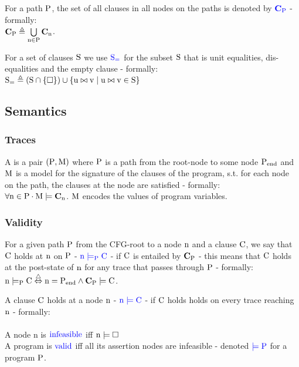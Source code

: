 \noindent
For a path $\mathrm{P}$, the set of all clauses in all nodes on the paths is denoted by $\textcolor{blue}{\mathbf{C}_{\mathrm{P}}}$ - formally:\\
$\mathrm{ \mathbf{C}_{\mathrm{P}} \triangleq \bigcup\limits_{n \in P} \mathbf{C}_{\mathrm{n}}}$.

\noindent
For a set of clauses $\mathrm{S}$ we use $\textcolor{blue}{\mathrm{{S}_{=}}}$ for the subset $\mathrm{S}$ that is unit equalities, dis-equalities and the empty clause - formally:\\
$\mathrm{\mathrm{{S}_{=}} \triangleq (S \cap \left\{\mathrm{\square}\right\}) \cup \left\{\mathrm{u \bowtie v \mid u \bowtie v \in S}\right\}}$


\subsection*{Semantics}
\subsubsection*{Traces}
A  is a pair $\mathrm{(P,M)}$ where $\mathrm{P}$ is a path from the root-node to some node $\mathrm{P_{end}}$ and $\mathrm{M}$ is a model for the signature of the clauses of the program, s.t. for each node on the path, the clauses at the node are satisfied - formally:\\
$\mathrm{\forall n \in P \cdot M \models \mathbf{C}_{\mathrm{n}}}$. $\mathrm{M}$ encodes the values of program variables.

\subsubsection*{Validity}
For a given path $\mathrm{P}$ from the CFG-root to a node $\mathrm{n}$ and a clause $\mathrm{C}$, 
we say that $\mathrm{C}$ holds at $\mathrm{n}$ on $\mathrm{P}$ - $\textcolor{blue}{\mathrm{n \models_P C}}$ - if $\mathrm{C}$ is entailed by $\mathbf{C}_{\mathrm{P}}$ - 
this means that $\mathrm{C}$ holds at the post-state of $\mathrm{n}$ for any trace that passes through $\mathrm{P}$ - formally:\\
$\m{n \models_P C \equivdef n = P_{end} \land \clauses{P} \models C}$.

\noindent
A clause $\mathrm{C}$ holds at a node $\mathrm{n}$ - $\textcolor{blue}{\mathrm{n \models C}}$ - if $\mathrm{C}$ holds holds on every trace reaching $\mathrm{n}$ - formally:\\
\\
A node n is $\textcolor{blue}{\mathrm{infeasible}}$ iff $\mathrm{n \models \square}$\\
A program is $\textcolor{blue}{\mathrm{valid}}$ iff all its assertion nodes are infeasible - denoted $\textcolor{blue}{\mathrm{\models P}}$ for a program $\mathrm{P}$.


